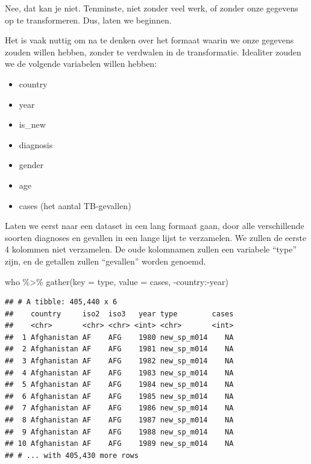 \documentclass[]{tufte-book}
\newenvironment{Shaded}{}{}
\newcommand{\AttributeTok}[1]{\textcolor[rgb]{0.49,0.56,0.16}{#1}}
\newcommand{\FunctionTok}[1]{\textcolor[rgb]{0.02,0.16,0.49}{#1}}
\newcommand{\NormalTok}[1]{#1}
\newcommand{\SpecialCharTok}[1]{\textcolor[rgb]{0.25,0.44,0.63}{#1}}
\providecommand{\tightlist}{%
  \setlength{\itemsep}{0pt}\setlength{\parskip}{0pt}}
\begin{document}
Nee, dat kan je niet. Tenminste, niet zonder veel werk, of zonder onze gegevens op te transformeren. Dus, laten we beginnen.

Het is vaak nuttig om na te denken over het formaat waarin we onze gegevens zouden willen hebben, zonder te verdwalen in de transformatie. Idealiter zouden we de volgende variabelen willen hebben:

\begin{itemize}
\tightlist
\item
  country
\item
  year
\item
  is\_new
\item
  diagnosis
\item
  gender
\item
  age
\item
  cases (het aantal TB-gevallen)
\end{itemize}

Laten we eerst naar een dataset in een lang formaat gaan, door alle verschillende soorten diagnoses en gevallen in een lange lijst te verzamelen. We zullen de eerste 4 kolommen niet verzamelen. De oude kolomnamen zullen een variabele ``type'' zijn, en de getallen zullen ``gevallen'' worden genoemd.

\begin{Shaded}
\begin{Highlighting}[]
\NormalTok{who }\SpecialCharTok{\%\textgreater{}\%}
  \FunctionTok{gather}\NormalTok{(}\AttributeTok{key =}\NormalTok{ type, }\AttributeTok{value =}\NormalTok{ cases, }\SpecialCharTok{{-}}\NormalTok{country}\SpecialCharTok{:{-}}\NormalTok{year)}
\end{Highlighting}
\end{Shaded}

\begin{verbatim}
## # A tibble: 405,440 x 6
##    country     iso2  iso3   year type        cases
##    <chr>       <chr> <chr> <int> <chr>       <int>
##  1 Afghanistan AF    AFG    1980 new_sp_m014    NA
##  2 Afghanistan AF    AFG    1981 new_sp_m014    NA
##  3 Afghanistan AF    AFG    1982 new_sp_m014    NA
##  4 Afghanistan AF    AFG    1983 new_sp_m014    NA
##  5 Afghanistan AF    AFG    1984 new_sp_m014    NA
##  6 Afghanistan AF    AFG    1985 new_sp_m014    NA
##  7 Afghanistan AF    AFG    1986 new_sp_m014    NA
##  8 Afghanistan AF    AFG    1987 new_sp_m014    NA
##  9 Afghanistan AF    AFG    1988 new_sp_m014    NA
## 10 Afghanistan AF    AFG    1989 new_sp_m014    NA
## # ... with 405,430 more rows
\end{verbatim}
\end{document}
